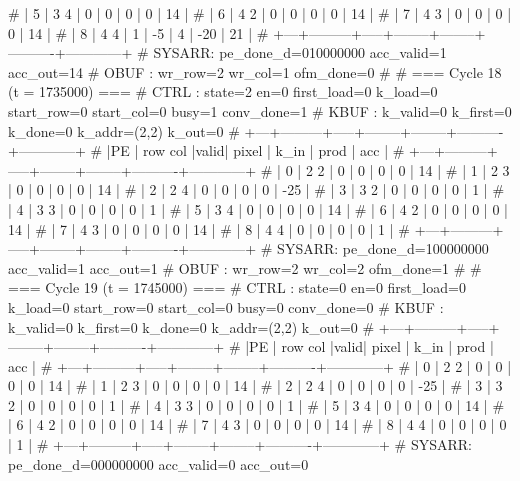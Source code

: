 # | 5 |   3   4 |  0  |      0 |      0 |        0 |         14 |
# | 6 |   4   2 |  0  |      0 |      0 |        0 |         14 |
# | 7 |   4   3 |  0  |      0 |      0 |        0 |         14 |
# | 8 |   4   4 |  1  |     -5 |      4 |      -20 |         21 |
# +---+---------+-----+--------+--------+----------+------------+
# SYSARR: pe_done_d=010000000 acc_valid=1 acc_out=14
# OBUF : wr_row=2 wr_col=1 ofm_done=0
# 
# === Cycle 18  (t = 1735000) ===
# CTRL : state=2 en=0 first_load=0 k_load=0 start_row=0 start_col=0 busy=1 conv_done=1
# KBUF : k_valid=0 k_first=0 k_done=0 k_addr=(2,2) k_out=0
# +---+---------+-----+--------+--------+----------+------------+
# |PE | row col |valid| pixel  |  k_in  |   prod   |    acc     |
# +---+---------+-----+--------+--------+----------+------------+
# | 0 |   2   2 |  0  |      0 |      0 |        0 |         14 |
# | 1 |   2   3 |  0  |      0 |      0 |        0 |         14 |
# | 2 |   2   4 |  0  |      0 |      0 |        0 |        -25 |
# | 3 |   3   2 |  0  |      0 |      0 |        0 |          1 |
# | 4 |   3   3 |  0  |      0 |      0 |        0 |          1 |
# | 5 |   3   4 |  0  |      0 |      0 |        0 |         14 |
# | 6 |   4   2 |  0  |      0 |      0 |        0 |         14 |
# | 7 |   4   3 |  0  |      0 |      0 |        0 |         14 |
# | 8 |   4   4 |  0  |      0 |      0 |        0 |          1 |
# +---+---------+-----+--------+--------+----------+------------+
# SYSARR: pe_done_d=100000000 acc_valid=1 acc_out=1
# OBUF : wr_row=2 wr_col=2 ofm_done=1
# 
# === Cycle 19  (t = 1745000) ===
# CTRL : state=0 en=0 first_load=0 k_load=0 start_row=0 start_col=0 busy=0 conv_done=0
# KBUF : k_valid=0 k_first=0 k_done=0 k_addr=(2,2) k_out=0
# +---+---------+-----+--------+--------+----------+------------+
# |PE | row col |valid| pixel  |  k_in  |   prod   |    acc     |
# +---+---------+-----+--------+--------+----------+------------+
# | 0 |   2   2 |  0  |      0 |      0 |        0 |         14 |
# | 1 |   2   3 |  0  |      0 |      0 |        0 |         14 |
# | 2 |   2   4 |  0  |      0 |      0 |        0 |        -25 |
# | 3 |   3   2 |  0  |      0 |      0 |        0 |          1 |
# | 4 |   3   3 |  0  |      0 |      0 |        0 |          1 |
# | 5 |   3   4 |  0  |      0 |      0 |        0 |         14 |
# | 6 |   4   2 |  0  |      0 |      0 |        0 |         14 |
# | 7 |   4   3 |  0  |      0 |      0 |        0 |         14 |
# | 8 |   4   4 |  0  |      0 |      0 |        0 |          1 |
# +---+---------+-----+--------+--------+----------+------------+
# SYSARR: pe_done_d=000000000 acc_valid=0 acc_out=0
